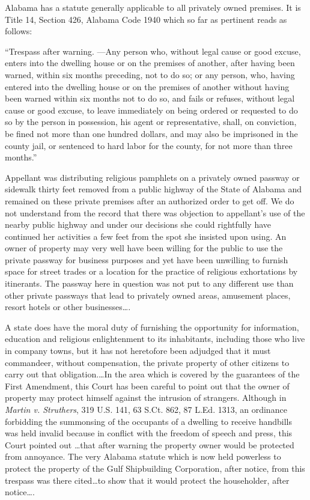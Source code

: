 Alabama has a statute generally applicable to all privately owned premises. It
is Title 14, Section 426, Alabama Code 1940 which so far as pertinent reads as
follows:

``Trespass after warning. ---Any person who, without legal cause or good
excuse, enters into the dwelling house or on the premises of another, after
having been warned, within six months preceding, not to do so; or any person,
who, having entered into the dwelling house or on the premises of another
without having been warned within six months not to do so, and fails or
refuses, without legal cause or good excuse, to leave immediately on being
ordered or requested to do so by the person in possession, his agent or
representative, shall, on conviction, be fined not more than one hundred
dollars, and may also be imprisoned in the county jail, or sentenced to hard
labor for the county, for not more than three months.''

Appellant was distributing religious pamphlets on a privately owned passway or
sidewalk thirty feet removed from a public highway of the State of Alabama and
remained on these private premises after an authorized order to get off. We do
not understand from the record that there was objection to appellant's use of
the nearby public highway and under our decisions she could rightfully have
continued her activities a few feet from the spot she insisted upon using. An
owner of property may very well have been willing for the public to use the
private passway for business purposes and yet have been unwilling to furnish
space for street trades or a location for the practice of religious
exhortations by itinerants. The passway here in question was not put to any
different use than other private passways that lead to privately owned areas,
amusement places, resort hotels or other businesses\ldots.

A state does have the moral duty of furnishing the opportunity for information,
education and religious enlightenment to its inhabitants, including those who
live in company towns, but it has not heretofore been adjudged that it must
commandeer, without compensation, the private property of other citizens to
carry out that obligation.\ldots  In the area which is covered by the
guarantees of the First Amendment, this Court has been careful to point out
that the owner of property may protect himself against the intrusion of
strangers. Although in \textit{Martin v. Struthers}, 319 U.S. 141, 63 S.Ct.
862, 87 L.Ed. 1313, an ordinance forbidding the summonsing of the occupants of
a dwelling to receive handbills was held invalid because in conflict with the
freedom of speech and press, this Court pointed out \ldots  that after warning
the property owner would be protected from annoyance.  The very Alabama statute
which is now held powerless to protect the property of the Gulf Shipbuilding
Corporation, after notice, from this trespass was there cited\ldots to show
that it would protect the householder, after notice\ldots.

